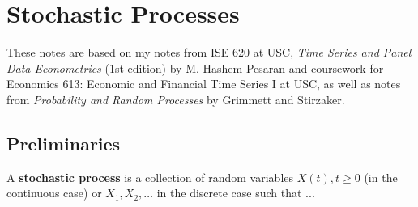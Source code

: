 %
%
%
%
%
%
%
%
%
%
%
%
%
%

\section{Stochastic Processes}

These notes are based on my notes from ISE 620 at USC, \textit{Time Series and Panel Data Econometrics} (1st edition) by M. Hashem Pesaran and coursework for Economics 613: Economic and Financial Time Series I at USC, as well as notes from \textit{Probability and Random Processes} by Grimmett and Stirzaker.

\subsection{Preliminaries}

\begin{definition} A \textbf{stochastic process} is a collection of random variables \(X(t), t\geq 0\) (in the continuous case) or \(X_1, X_2, \ldots\) in the discrete case such that ...

\end{definition}

